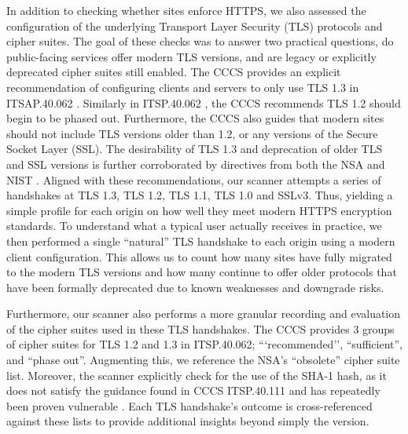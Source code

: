 \documentclass[pdflatex,sn-mathphys-num]{sn-jnl}
\numberwithin{equation}{section}
\theoremstyle{thmstyleone}
\theoremstyle{thmstyletwo}%
\theoremstyle{thmstylethree}%
\begin{document}
\vspace{1em}In addition to checking whether sites enforce HTTPS, we also assessed the configuration of the 
underlying Transport Layer Security (TLS) protocols and cipher suites.
The goal of these checks was to answer two practical questions, do public-facing services offer modern TLS versions, 
and are legacy or explicitly deprecated cipher
suites still enabled. The CCCS provides an explicit recommendation of configuring clients and servers to only 
use TLS 1.3 in 
ITSAP.40.062 \cite{cccs-itsap-40016}. Similarly in ITSP.40.062 , the CCCS recommends TLS 1.2 should begin to be phased out. Furthermore, the CCCS also guides that
modern sites should not include TLS versions older than 1.2, or any versions of the Secure Socket Layer (SSL). 
The desirability of TLS 1.3 and deprecation of older TLS and SSL versions is further corroborated by directives 
from both the NSA and NIST \cite{nist_800_52r2, nsa_eliminating_obsolete_tls}. Aligned with these recommendations, 
our scanner attempts a series of handshakes at TLS 1.3, TLS 1.2, TLS 1.1, TLS 1.0 and SSLv3. Thus, yielding a simple profile for each origin on how well they meet 
modern HTTPS encryption standards. To understand what a typical user actually receives in practice, we then
performed a single ``natural'' TLS handshake to each origin using a modern
client configuration. This allows us to count how many sites have fully migrated to the modern TLS versions and how many continue to offer older protocols that have
been formally deprecated due to known weaknesses and downgrade risks.

\vspace{1em}Furthermore, our scanner also performs a more granular recording and evaluation of the cipher suites used in these TLS handshakes. 
The CCCS provides 3 groups of cipher suites for TLS 1.2 and 1.3 in ITSP.40.062; ```recommended'', ``sufficient'', and ``phase out''. Augmenting this, we
reference the NSA's ``obsolete'' cipher suite list. Moreover, the scanner explicitly check for the use of the SHA-1 hash, as it does not satisfy the guidance found
in CCCS ITSP.40.111 \cite{cccs_itsp_40_111} and has repeatedly been proven vulnerable \cite{leurent2020shambles, polk2011sha, stevens2017firstsha1collision}. 
Each TLS handshake's outcome is cross-referenced against these lists to provide additional insights beyond simply the version.  
\end{document}
